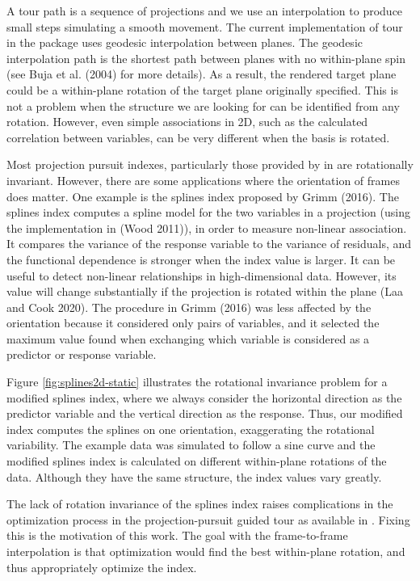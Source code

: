 \documentclass{article}
\begin{document}
A tour path is a sequence of projections and we use an interpolation to
produce small steps simulating a smooth movement. The current
implementation of tour in the  package uses geodesic
interpolation between planes. The geodesic interpolation path is the
shortest path between planes with no within-plane spin (see Buja et al.
(2004) for more details). As a result, the rendered target plane could
be a within-plane rotation of the target plane originally specified.
This is not a problem when the structure we are looking for can be
identified from any rotation. However, even simple associations in 2D,
such as the calculated correlation between variables, can be very
different when the basis is rotated.

Most projection pursuit indexes, particularly those provided by in
 are rotationally invariant. However, there are some
applications where the orientation of frames does matter. One example is
the splines index proposed by Grimm (2016). The splines index computes a
spline model for the two variables in a projection (using the
implementation in  (Wood 2011)), in order to measure
non-linear association. It compares the variance of the response
variable to the variance of residuals, and the functional dependence is
stronger when the index value is larger. It can be useful to detect
non-linear relationships in high-dimensional data. However, its value
will change substantially if the projection is rotated within the plane
(Laa and Cook 2020). The procedure in Grimm (2016) was less affected by
the orientation because it considered only pairs of variables, and it
selected the maximum value found when exchanging which variable is
considered as a predictor or response variable.

Figure \ref{fig:splines2d-static} illustrates the rotational invariance
problem for a modified splines index, where we always consider the
horizontal direction as the predictor variable and the vertical
direction as the response. Thus, our modified index computes the splines
on one orientation, exaggerating the rotational variability. The example
data was simulated to follow a sine curve and the modified splines index
is calculated on different within-plane rotations of the data. Although
they have the same structure, the index values vary greatly.

The lack of rotation invariance of the splines index raises
complications in the optimization process in the projection-pursuit
guided tour as available in . Fixing this is the
motivation of this work. The goal with the frame-to-frame interpolation
is that optimization would find the best within-plane rotation, and thus
appropriately optimize the index.
\end{document}
